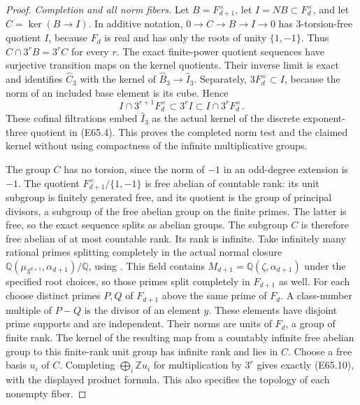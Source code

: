 \begin{proof}
\emph{Completion and all norm fibers.}
Let $B=F_{d+1}^\times$, let $I=N B\subset F_d^\times$, and let
$C=\ker(B\to I)$. In additive notation,
$0\to C\to B\to I\to0$ has $3$-torsion-free quotient $I$,
because $F_d$ is real and has only the roots of unity $\{1,-1\}$.
Thus $C\cap3^r B=3^r C$ for every $r$.
The exact finite-power quotient sequences have surjective transition
maps on the kernel quotients. Their inverse limit is exact and
identifies $\widehat C_3$ with the kernel of
$\widehat B_3\to\widehat I_3$.
Separately, $3F_d^\times\subset I$, because the norm of an included
base element is its cube. Hence
\[
 I\cap3^{r+1}F_d^\times\subset3^r I
                  \subset I\cap3^rF_d^\times.
 \tag{E65.17}
\]
These cofinal filtrations embed $\widehat I_3$ as the actual kernel
of the discrete exponent-three quotient in (E65.4).
This proves the completed norm test and the claimed kernel without
using compactness of the infinite multiplicative groups.

The group $C$ has no torsion, since the norm of $-1$ in an odd-degree
extension is $-1$.
The quotient $F_{d+1}^\times/\{1,-1\}$ is free abelian of countable
rank: its unit subgroup is finitely generated free, and its quotient
is the group of principal divisors, a subgroup of the free abelian
group on the finite primes. The latter is free, so the exact sequence
splits as abelian groups. The subgroup $C$ is therefore free abelian
of at most countable rank.
Its rank is infinite. Take infinitely many rational primes splitting
completely in the actual normal closure
$\mathbb Q(\mu_{3^{d+1}},\alpha_{d+1})/\mathbb Q$, using
\cite[VIII, Theorem7.4]{E_MilneCFT}.
This field contains $M_{d+1}=\mathbb Q(\zeta,\alpha_{d+1})$
under the specified root choices, so those primes split completely
in $F_{d+1}$ as well.
For each choose distinct primes $P,Q$ of $F_{d+1}$ above the same
prime of $F_d$. A class-number multiple of $P-Q$ is the divisor of
an element $y$. These elements have disjoint prime supports and are
independent. Their norms are units of $F_d$, a group of finite rank.
The kernel of the resulting map from a countably infinite free
abelian group to this finite-rank unit group has infinite rank and
lies in $C$.
Choose a free basis $u_i$ of $C$.
Completing $\bigoplus_i\mathbb Z u_i$ for multiplication by $3^r$
gives exactly (E65.10), with the displayed product formula.
This also specifies the topology of each nonempty fiber.


\end{proof}
